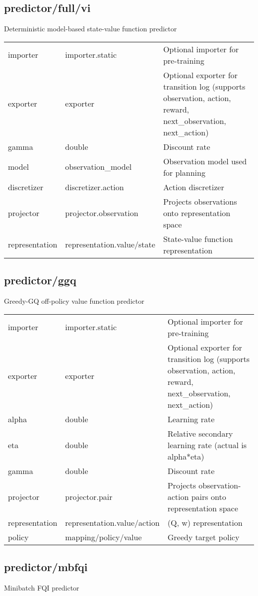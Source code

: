 \subsection{predictor/full/vi}
\noindent Deterministic model-based state-value function predictor\\

\noindent\begin{tabular}{@{}lll@{}}
importer&importer.static&Optional importer for pre-training\\
exporter&exporter&Optional exporter for transition log (supports observation, action, reward, next\_observation, next\_action)\\
gamma&double&Discount rate\\
model&observation\_model&Observation model used for planning\\
discretizer&discretizer.action&Action discretizer\\
projector&projector.observation&Projects observations onto representation space\\
representation&representation.value/state&State-value function representation\\
\end{tabular}
\subsection{predictor/ggq}
\noindent Greedy-GQ off-policy value function predictor\\

\noindent\begin{tabular}{@{}lll@{}}
importer&importer.static&Optional importer for pre-training\\
exporter&exporter&Optional exporter for transition log (supports observation, action, reward, next\_observation, next\_action)\\
alpha&double&Learning rate\\
eta&double&Relative secondary learning rate (actual is alpha*eta)\\
gamma&double&Discount rate\\
projector&projector.pair&Projects observation-action pairs onto representation space\\
representation&representation.value/action&(Q, w) representation\\
policy&mapping/policy/value&Greedy target policy\\
\end{tabular}
\subsection{predictor/mbfqi}
\noindent Minibatch FQI predictor\\

